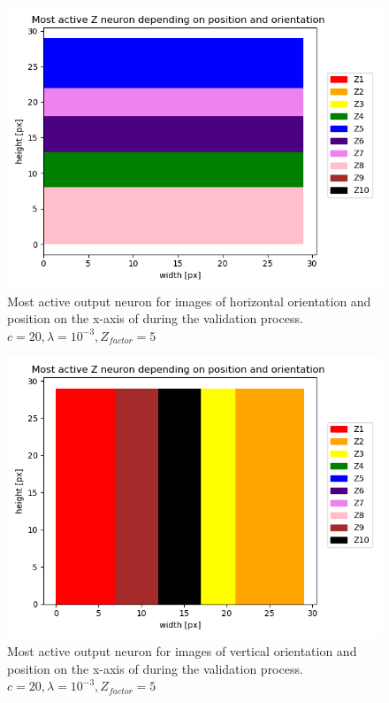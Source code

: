 \begin{figure}
  \includegraphics[width=\linewidth]{figures/horvert/horvert_c20_3_Zfactor5_horizontalLines.png}
  \caption{Most active output neuron for images of horizontal orientation and position on the x-axis of during the validation process. $c = 20, \lambda = 10^{-3}, Z_{factor} = 5$}
  \label{fig:horvert_c20_3_Zfactor5_horizontalLines}
\end{figure}

\begin{figure}
  \includegraphics[width=\linewidth]{figures/horvert/horvert_c20_3_Zfactor5_verticalLines.png}
  \caption{Most active output neuron for images of vertical orientation and position on the x-axis of during the validation process. $c = 20, \lambda = 10^{-3}, Z_{factor} = 5$}
  \label{fig:horvert_c20_3_Zfactor5_verticalLines}
\end{figure}

